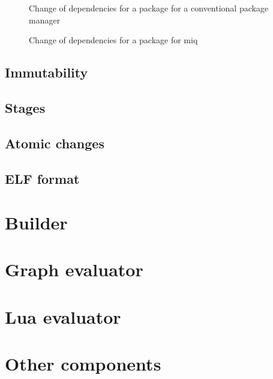\begin{figure}[hbtp]
    \centerfloat
    
    \caption{Change of dependencies for a package for a conventional package manager}
    \label{fig:depswap}
\end{figure}

\begin{figure}[hbtp]
    \centerfloat
    
    \caption{Change of dependencies for a package for miq}
    \label{fig:depswap_miq}
\end{figure}



\subsection{Immutability}

\subsection{Stages}

\subsection{Atomic changes}

\subsection{ELF format}


\section{Builder}

\section{Graph evaluator}

\section{Lua evaluator}

\section{Other components}

